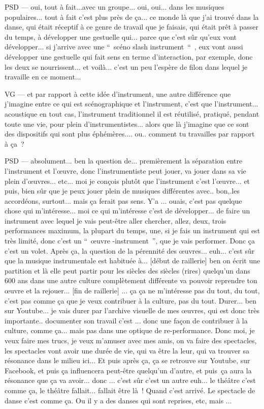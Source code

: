 PSD — oui, tout à fait...avec un groupe... oui, oui... dans les musiques populaires... tout à fait c'est plus près de ça... ce monde là que j'ai trouvé dans la danse, qui était réceptif à ce genre de travail que je faisais, qui était prêt à passer du temps, à développer une gestuelle qui... parce que c'est sûr qu'eux vont développer... si j'arrive avec une “ scéno slash instrument “ , eux vont aussi développer une gestuelle qui fait sens en terme d'interaction, par exemple, donc les deux se nourrissent... et voilà... c'est un peu l'espère de filon dans lequel je travaille en ce moment... 

VG — et par rapport à cette idée d'instrument, une autre différence que j'imagine entre ce qui est scénographique et l'instrument, c'est que l'instrument... acoustique en tout cas, l'instrument traditionnel il est réutilisé, pratiqué, pendant toute une vie, pour plein d'instrumentistes... alors que là j'imagine que ce sont des dispositifs qui sont plus éphémères.... ou.. comment tu travailles par rapport à ça ? 

PSD — absolument... ben la question de... premièrement la séparation entre l'instrument et l'œuvre, donc l'instrumentiste peut jouer, va jouer dans sa vie plein d'œuvres... etc...  moi je conçois plutôt que l'instrument c'est l'œuvre... et puis, bien sûr que je peux jouer plein de musiques différentes avec.. bon,.les accordéons, surtout... mais ça ferait pas sens. Y'a ... ouais, c'est pas quelque chose qui m'intéresse... moi ce qui m'intéresse c'est de développer... de faire un instrument avec lequel je vais peut-être aller chercher, allez, deux, trois performances maximum, la plupart du temps, une, si je fais un instrument qui est très limité, donc c'est un “ œuvre -instrument ”, que je vais performer. Donc ça c'est un volet. Après ça, la question de la pérennité des œuvres... euh... c'est sûr que la musique instrumentale est habituée à... [début de raillerie] ben on écrit une partition et là elle peut partir pour les siècles des siècles (rires)  quelqu'un dans 600 ans dans une autre culture complètement différente va pouvoir reprendre ton œuvre et la rejouer... [fin de raillerie] ... ça ça ne m'intéresse pas du tout, du tout, c'est pas comme ça que je veux contribuer à la culture, pas du tout. Durer... ben sur Youtube... je vais durer par l'archive visuelle de mes œuvres, qui est donc très importante.. documenter son travail c'est ... donc une façon de contribuer à la culture, comme ça... mais pas dans une optique de re-performance. Donc moi, je veux faire mes trucs, je veux m'amuser avec mes amis, on va faire des spectacles, les spectacles vont avoir une durée de vie, qui va être la leur, qui va trouver sa résonance dans le milieu ici... Et puis après ça, ça se retrouve sur Youtube, sur Facebook, et puis ça influencera peut-être quelqu'un d'autre, et puis ça aura la résonance que ça va avoir... donc ... c'est sûr c'est un autre euh... le théâtre c'est comme ça, le théâtre fallait... fallait être là ! Quand c'est arrivé. Le spectacle de danse c'est comme ça. Ou il y a des danses qui sont reprises, etc, mais ... 

